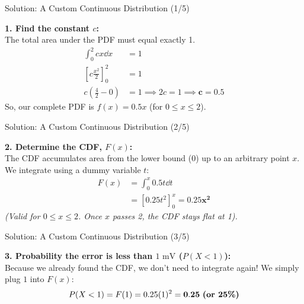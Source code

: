 \begin{frame}{Solution: A Custom Continuous Distribution (1/5)}
    \begin{solution}
        \textbf{1. Find the constant $c$:} \\
        The total area under the PDF must equal exactly 1.
        \begin{align*}
            \int_{0}^{2} cx \dd x &= 1 \\
            \left[ c \frac{x^2}{2} \right]_{0}^{2} &= 1 \\
            c \left( \frac{4}{2} - 0 \right) &= 1 \implies 2c = 1 \implies \mathbf{c = 0.5}
        \end{align*}
        So, our complete PDF is $f(x) = 0.5x$ (for $0 \leq x \leq 2$).
    \end{solution}
\end{frame}

\begin{frame}{Solution: A Custom Continuous Distribution (2/5)}
    \begin{solutioncont}
        \textbf{2. Determine the CDF, $F(x)$:} \\
        The CDF accumulates area from the lower bound ($0$) up to an arbitrary point $x$. We integrate using a dummy variable $t$:
        \begin{align*}
            F(x) &= \int_{0}^{x} 0.5t \dd t \\
                 &= \left[ 0.25 t^2 \right]_{0}^{x} = \mathbf{0.25 x^2}
        \end{align*}
        \textit{(Valid for $0 \leq x \leq 2$. Once $x$ passes 2, the CDF stays flat at 1).}
    \end{solutioncont}
\end{frame}

\begin{frame}{Solution: A Custom Continuous Distribution (3/5)}
    \begin{solutioncont}
        \textbf{3. Probability the error is less than $1\text{ mV}$ ($P(X < 1)$):} \\
        Because we already found the CDF, we don't need to integrate again! We simply plug $1$ into $F(x)$:
        \[ P(X < 1) = F(1) = 0.25(1)^2 = \mathbf{0.25} \text{ \textbf{(or 25\%)}} \]
    \end{solutioncont}
\end{frame}

